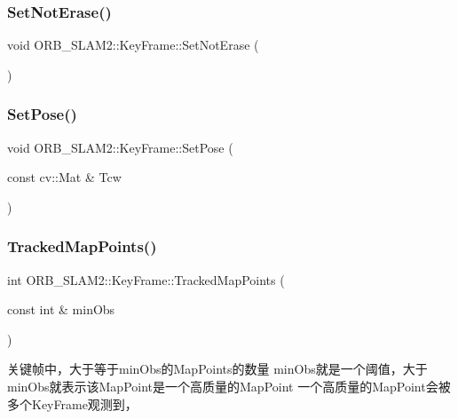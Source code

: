\subsubsection{\texorpdfstring{Set\+Not\+Erase()}{SetNotErase()}}
{\footnotesize\ttfamily void O\+R\+B\+\_\+\+S\+L\+A\+M2\+::\+Key\+Frame\+::\+Set\+Not\+Erase (\begin{DoxyParamCaption}{ }\end{DoxyParamCaption})}

\mbox{\label{class_o_r_b___s_l_a_m2_1_1_key_frame_aa799150fa33f3b9a404226454b96c95a}} 
\subsubsection{\texorpdfstring{Set\+Pose()}{SetPose()}}
{\footnotesize\ttfamily void O\+R\+B\+\_\+\+S\+L\+A\+M2\+::\+Key\+Frame\+::\+Set\+Pose (\begin{DoxyParamCaption}\item[{const cv\+::\+Mat \&}]{Tcw }\end{DoxyParamCaption})}

\mbox{\label{class_o_r_b___s_l_a_m2_1_1_key_frame_a729cbf2c84db5cbfdda98a9612f8cd0b}} 
\subsubsection{\texorpdfstring{Tracked\+Map\+Points()}{TrackedMapPoints()}}
{\footnotesize\ttfamily int O\+R\+B\+\_\+\+S\+L\+A\+M2\+::\+Key\+Frame\+::\+Tracked\+Map\+Points (\begin{DoxyParamCaption}\item[{const int \&}]{min\+Obs }\end{DoxyParamCaption})}



关键帧中，大于等于min\+Obs的\+Map\+Points的数量 min\+Obs就是一个阈值，大于min\+Obs就表示该\+Map\+Point是一个高质量的\+Map\+Point 一个高质量的\+Map\+Point会被多个\+Key\+Frame观测到， 


